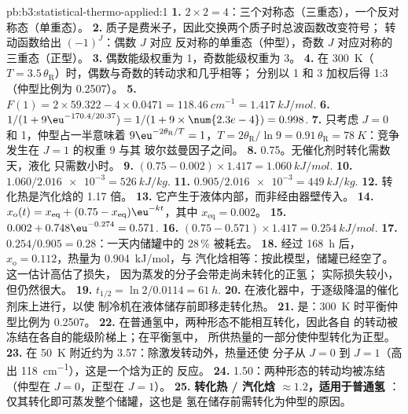 \begin{solution}{pb:b3:statistical-thermo-applied:1}
\textbf{1.} $2 \times 2 = 4$：三个对称态（三重态），一个反对称态（单重态）。
\textbf{2.} 质子是费米子，因此交换两个质子时总波函数改变符号；
转动函数给出 $(-1)^J$：偶数 $J$ 对应
反对称的单重态（仲型），奇数 $J$ 对应对称的三重态（正型）。
\textbf{3.} 偶数能级权重为 1，奇数能级权重为 3。
\textbf{4.} 在 \qty{300}{K}（$T = 3.5\,\theta_{\mathrm R}$）时，偶数与奇数的转动求和几乎相等；
分别以 1 和 3 加权后得 1:3（仲型比例为 0.2507）。
\textbf{5.} $F(1) = 2 \times 59.322 - 4 \times 0.0471 = \qty{118.46}{cm^{-1}} = \qty{1.417}{kJ/mol}$.
\textbf{6.} $1/(1 + 9\eu^{-170.4/20.37}) = 1/(1 + 9 \times \num{2.3e-4}) = 0.998$.
\textbf{7.} 只考虑 $J = 0$ 和 1，仲型占一半意味着 $9\eu^{-2\theta_{\mathrm R}/T} = 1$，$T = 2\theta_{\mathrm R}/\ln9 =
0.91\,\theta_{\mathrm R} = \qty{78}{K}$：竞争发生在 $J = 1$ 的权重 9 与其
玻尔兹曼因子之间。
\textbf{8.} 0.75。无催化剂时转化需数天，液化
只需数小时。
\textbf{9.} $(0.75 - 0.002) \times 1.417 = \qty{1.060}{kJ/mol}$.
\textbf{10.} $1.060/\num{2.016e-3} = \qty{526}{kJ/kg}$.
\textbf{11.} $0.905/\num{2.016e-3} = \qty{449}{kJ/kg}$.
\textbf{12.} 转化热是汽化焓的 1.17 倍。
\textbf{13.} 它产生于液体内部，而非经由器壁传入。
\textbf{14.} $x_{\mathrm o}(t) = x_{\mathrm{eq}} + (0.75 - x_{\mathrm{eq}})\eu^{-kt}$，其中 $x_{\mathrm{eq}} = 0.002$。
\textbf{15.} $0.002 + 0.748\eu^{-0.274} = 0.571$.
\textbf{16.} $(0.75 - 0.571) \times 1.417 = \qty{0.254}{kJ/mol}$.
\textbf{17.} $0.254/0.905 = 0.28$：一天内储罐中的 28\,\% 被耗去。
\textbf{18.} 经过 \qty{168}{h} 后，$x_{\mathrm o} = 0.112$，热量为 \qty{0.904}{kJ/mol}，与
汽化焓相等：按此模型，储罐已经空了。这一估计高估了损失，
因为蒸发的分子会带走尚未转化的正氢；
实际损失较小，但仍然很大。
\textbf{19.} $t_{1/2} = \ln2/0.0114 = \qty{61}{h}$.
\textbf{20.} 在液化器中，于逐级降温的催化剂床上进行，以使
制冷机在液体储存前即移走转化热。
\textbf{21.} 是：\qty{300}{K} 时平衡仲型比例为 0.2507。
\textbf{22.} 在普通氢中，两种形态不能相互转化，因此各自
的转动被冻结在各自的能级阶梯上；在平衡氢中，
所供热量的一部分使仲型转化为正型。
\textbf{23.} 在 \qty{50}{K} 附近约为 3.57：除激发转动外，热量还使
分子从 $J = 0$ 到 $J = 1$（高出 \qty{118}{cm^{-1}}），这是一个焓为正的
反应。
\textbf{24.} 1.50：两种形态的转动均被冻结（仲型在 $J = 0$，正型在 $J = 1$）。
\textbf{25.} \textbf{转化热 / 汽化焓 $\approx 1.2$，适用于普通氢
}：仅其转化即可蒸发整个储罐，这也是
氢在储存前需转化为仲型的原因。
\end{solution}
